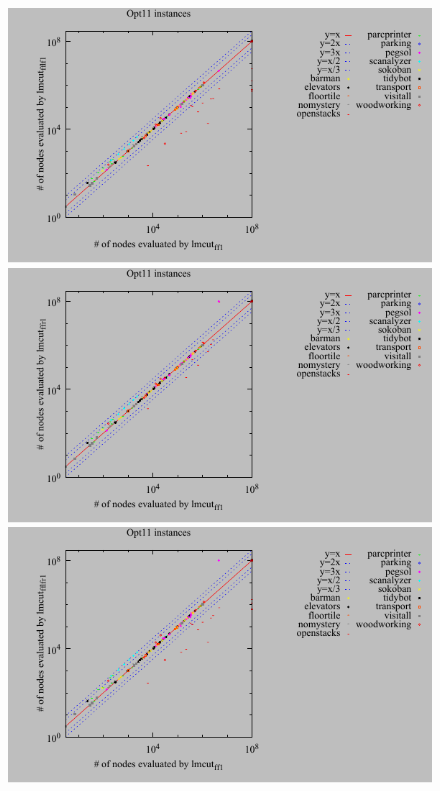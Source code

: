\begin{figure}[htbp]
 \centering
 \includegraphics{tables/opt11-evaluated-lmcut_ff-lmcut_fflf.pdf}
 \includegraphics{tables/opt11-evaluated-lmcut_ff-lmcut_ffr.pdf}
 \includegraphics{tables/opt11-evaluated-lmcut_ff-lmcut_fflfr.pdf}
 \caption{}
 \label{portfolio-ff}
\end{figure}

